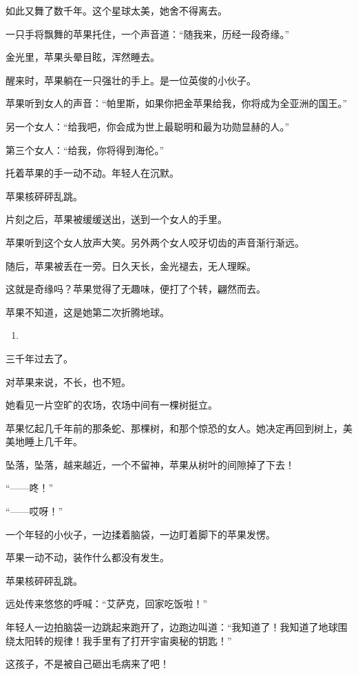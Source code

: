 \documentclass[]{ctexbook}
\begin{document}
如此又舞了数千年。这个星球太美，她舍不得离去。

一只手将飘舞的苹果托住，一个声音道：``随我来，历经一段奇缘。''

金光里，苹果头晕目眩，浑然睡去。

醒来时，苹果躺在一只强壮的手上。是一位英俊的小伙子。

苹果听到女人的声音：``帕里斯，如果你把金苹果给我，你将成为全亚洲的国王。''

另一个女人：``给我吧，你会成为世上最聪明和最为功勋显赫的人。''

第三个女人：``给我，你将得到海伦。''

托着苹果的手一动不动。年轻人在沉默。

苹果核砰砰乱跳。

片刻之后，苹果被缓缓送出，送到一个女人的手里。

苹果听到这个女人放声大笑。另外两个女人咬牙切齿的声音渐行渐远。

随后，苹果被丢在一旁。日久天长，金光褪去，无人理睬。

这就是奇缘吗？苹果觉得了无趣味，便打了个转，翩然而去。

苹果不知道，这是她第二次折腾地球。

\begin{enumerate}
\def\labelenumi{(\arabic{enumi})}
\setcounter{enumi}{2}
\item
\end{enumerate}

三千年过去了。

对苹果来说，不长，也不短。

她看见一片空旷的农场，农场中间有一棵树挺立。

苹果忆起几千年前的那条蛇、那棵树，和那个惊恐的女人。她决定再回到树上，美美地睡上几千年。

坠落，坠落，越来越近，一个不留神，苹果从树叶的间隙掉了下去！

``------咚！''

``------哎呀！''

一个年轻的小伙子，一边揉着脑袋，一边盯着脚下的苹果发愣。

苹果一动不动，装作什么都没有发生。

苹果核砰砰乱跳。

远处传来悠悠的呼喊：``艾萨克，回家吃饭啦！''

年轻人一边拍脑袋一边跳起来跑开了，边跑边叫道：``我知道了！我知道了地球围绕太阳转的规律！我手里有了打开宇宙奥秘的钥匙！''

这孩子，不是被自己砸出毛病来了吧！
\end{document}

